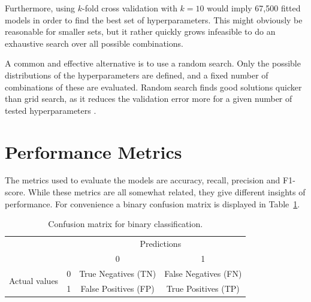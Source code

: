 Furthermore, using $k$-fold cross validation with $k=10$ would imply 67,500 fitted models in order to find the best set of hyperparameters. This might obviously be reasonable for smaller sets, but it rather quickly grows infeasible to do an exhaustive search over all possible combinations. 

A common and effective alternative is to use a random search. Only the possible distributions of the hyperparameters are defined, and a fixed number of combinations of these are evaluated. Random search finds good solutions quicker than grid search, as it reduces the validation error more for a given number of tested hyperparameters \citep{Goodfellow-et-al-2016}. 

\section{Performance Metrics}
The metrics used to evaluate the models are accuracy, recall, precision and F1-score. While these metrics are all somewhat related, they give different insights of performance. For convenience a binary confusion matrix is displayed in Table~\ref{fig:confmat}. 

\begin{table}[ht]
\centering
\begin{tabular}{cccc}
     & & \multicolumn{2}{c}{Predictions} \\
     & & \multicolumn{1}{|c|}{0} & \multicolumn{1}{c|}{1}\\
      \cline{2-4}
     \multirow{2}{*}{Actual values} & 0 & \multicolumn{1}{|c|}{True Negatives (TN)} &  \multicolumn{1}{c|}{False Negatives (FN)} \\
      & 1 & \multicolumn{1}{|c|}{False Positives (FP)} & \multicolumn{1}{c|}{True Positives (TP)} \\ 
\end{tabular}
\caption{Confusion matrix for binary classification.}
\label{fig:confmat}
\end{table}

